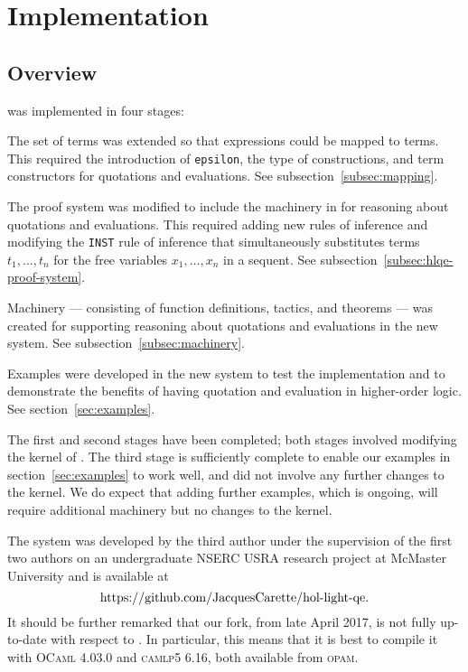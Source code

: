 \documentclass[fleqn]{llncs}
\begin{document}
\section{Implementation}\label{sec:implementation}

\subsection{Overview}

{\HLQE} was implemented in four stages:

\be

  \item The set of terms was extended so that {\churchqe}
    expressions could be mapped to {\HL} terms.  This required the
    introduction of \texttt{epsilon}, the type of constructions, and
    term constructors for quotations and evaluations.  See
    subsection~\ref{subsec:mapping}.

  \item The proof system was modified to include the machinery
    in {\churchqe} for reasoning about quotations and evaluations.
    This required adding new rules of inference and modifying
    the \texttt{INST} rule of inference that simultaneously
    substitutes terms $t_1,\ldots,t_n$ for the free variables
    $x_1,\ldots,x_n$ in a sequent.  See
    subsection~\ref{subsec:hlqe-proof-system}.

  \item Machinery --- consisting of {\HOL} function definitions,
    tactics, and theorems --- was created for supporting reasoning
    about quotations and evaluations in the new system.  See
    subsection~\ref{subsec:machinery}.

  \item Examples were developed in the new system to test the
    implementation and to demonstrate the benefits of having quotation
    and evaluation in higher-order logic.  See section~\ref{sec:examples}.

\ee

\noindent
The first and second stages have been completed; both stages involved
modifying the kernel of {\HL}.  The third stage is sufficiently
complete to enable our examples in section~\ref{sec:examples} to work
well, and did not involve any further changes to the {\HL} kernel.  We
do expect that adding further examples, which is ongoing, will require
additional machinery but no changes to the kernel.

The {\HLQE} system was developed by the third author under the
supervision of the first two authors on an undergraduate NSERC USRA
research project at McMaster University and is available at
\[\mbox{https://github.com/JacquesCarette/hol-light-qe}.\]
It should be further remarked that our fork, from late April 2017, is not fully
up-to-date with respect to {\HL}. In particular, this means that it is best to
compile it with \textsc{OCaml 4.03.0} and \textsc{camlp5 6.16},
both available from \textsc{opam}.
\end{document}
